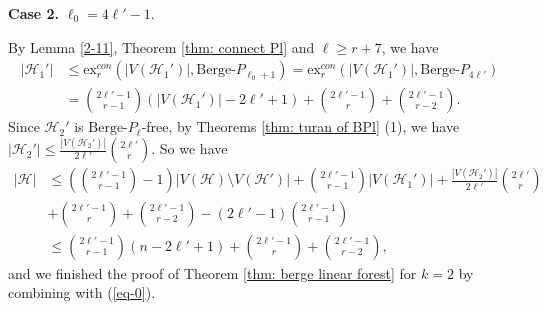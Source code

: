 \documentclass[12pt]{article}%
\def\QEDopen{{\hfill\setlength{\fboxsep}{0pt}\setlength{\fboxrule}{0.2pt}\fbox{\rule[0pt]{0pt}{1.3ex}\rule[0pt]{1.3ex}{0pt}}}}
\newcommand{\ber}{\text{Berge-}}
\newcommand{\mh}{\mathcal{H}}
\begin{document}
\noindent
\textbf{Case 2. } $\ell_0= 4\ell'-1$.

By Lemma \ref{2-11}, Theorem \ref{thm: connect Pl} and $\ell\geq r+7$, we have
    \begin{equation*}
        \begin{aligned}
            |\mh_{1}'|&\leq \mathrm{ex}_r^{con}(|V(\mh_{1}')|,\ber P_{\ell_0+1})= \mathrm{ex}_r^{con}(|V(\mh_{1}')|,\ber P_{4\ell'})\\
            &= \binom{2\ell'-1}{r-1}(|V(\mh_{1}')|-2\ell'+1)+\binom{2\ell'-1}{r}+\binom{2\ell'-1}{r-2}.
        \end{aligned}
    \end{equation*}Since $\mh_{2}'$ is $\ber P_{\ell}$-free, by Theorems \ref{thm: turan of BPl} (1), we have
     $|\mh_{2}'|\leq  \frac{|V(\mh_{2}')|}{2\ell'}\binom{2\ell'}{r}.$
   So we have
    \begin{equation*}
        \begin{aligned}
            |\mh|&\leq \left(\binom{2\ell'-1}{r-1}-1\right)|V(\mh)\setminus V(\mh')|+\binom{2\ell'-1}{r-1}|V(\mh_{1}')|+\frac{|V(\mh_{2}')|}{2\ell'}\binom{2\ell'}{r} \\
            &+\binom{2\ell'-1}{r}+\binom{2\ell'-1}{r-2}-(2\ell'-1)\binom{2\ell'-1}{r-1}\\
            &\leq \binom{2\ell'-1}{r-1}(n-2\ell'+1)+\binom{2\ell'-1}{r}+\binom{2\ell'-1}{r-2},
        \end{aligned}
    \end{equation*}
   and we finished the proof of Theorem \ref{thm: berge linear forest} for $k=2$ by combining with (\ref{eq-0}).


\QEDopen
\end{document}
